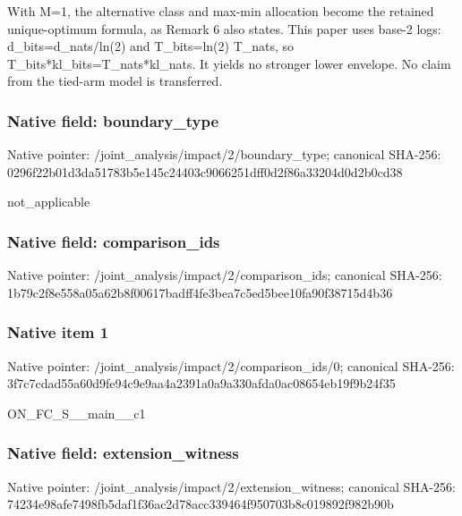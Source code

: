 \documentclass[10pt,a4paper]{article}
\begin{document}
\begingroup\raggedright\sloppy With M=\allowbreak{}1,\allowbreak{} the alternative class and max-min allocation become the retained unique-optimum formula,\allowbreak{} as Remark 6 also states. This paper uses base-2 logs:\allowbreak{} d\_\allowbreak{}bits=\allowbreak{}d\_\allowbreak{}nats/\allowbreak{}ln(2) and T\_\allowbreak{}bits=\allowbreak{}ln(2) T\_\allowbreak{}nats,\allowbreak{} so T\_\allowbreak{}bits*kl\_\allowbreak{}bits=\allowbreak{}T\_\allowbreak{}nats*kl\_\allowbreak{}nats. It yields no stronger lower envelope. No claim from the tied-arm model is transferred.\par\endgroup

\subsubsection{Native field: boundary\_\allowbreak{}type}
Native pointer: /joint\_\allowbreak{}analysis/impact/2/boundary\_\allowbreak{}type; canonical SHA-256: 0296f22b01d3da51783b5e145c24403c9066251dff0d2f86a33204d0d2b0cd38

\begingroup\raggedright\sloppy not\_\allowbreak{}applicable\par\endgroup

\subsubsection{Native field: comparison\_\allowbreak{}ids}
Native pointer: /joint\_\allowbreak{}analysis/impact/2/comparison\_\allowbreak{}ids; canonical SHA-256: 1b79c2f8e558a05a62b8f00617badff4fe3bea7c5ed5bee10fa90f38715d4b36

\subsubsection{Native item 1}
Native pointer: /joint\_\allowbreak{}analysis/impact/2/comparison\_\allowbreak{}ids/0; canonical SHA-256: 3f7c7cdad55a60d9fe94c9e9aa4a2391a0a9a330afda0ac08654eb19f9b24f35

\begingroup\raggedright\sloppy ON\_\allowbreak{}FC\_\allowbreak{}S\_\allowbreak{}\_\allowbreak{}main\_\allowbreak{}\_\allowbreak{}c1\par\endgroup

\subsubsection{Native field: extension\_\allowbreak{}witness}
Native pointer: /joint\_\allowbreak{}analysis/impact/2/extension\_\allowbreak{}witness; canonical SHA-256: 74234e98afe7498fb5daf1f36ac2d78acc339464f950703b8c019892f982b90b
\end{document}
